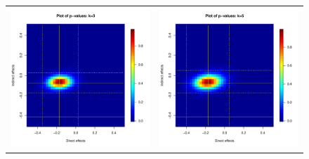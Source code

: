 \documentclass[12pt]{article}
\begin{document}
\begin{figure}
	\centering
	\begin{tabular}{cc}
	\includegraphics[scale=0.45]{./images/pval_plot_coppock_ideo_3nn.pdf} &
	\includegraphics[scale=0.45]{./images/pval_plot_coppock_ideo_5nn.pdf} \\ 

\end{tabular}
\end{figure}
\end{document}
